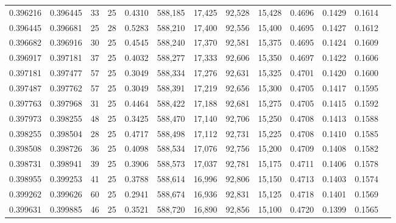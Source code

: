 \begin{tabular}{rrrrrrrrrrrrr}
0.396216 & 0.396445 &    33 &  25 &                                     0.4310 & 588,185 &  17,425 &  92,528 &  15,428 & 0.4696 & 0.1429 & 0.1614 \\
0.396445 & 0.396681 &    25 &  28 &                                     0.5283 & 588,210 &  17,400 &  92,556 &  15,400 & 0.4695 & 0.1427 & 0.1612 \\
0.396682 & 0.396916 &    30 &  25 &                                     0.4545 & 588,240 &  17,370 &  92,581 &  15,375 & 0.4695 & 0.1424 & 0.1609 \\
0.396917 & 0.397181 &    37 &  25 &                                     0.4032 & 588,277 &  17,333 &  92,606 &  15,350 & 0.4697 & 0.1422 & 0.1606 \\
0.397181 & 0.397477 &    57 &  25 &                                     0.3049 & 588,334 &  17,276 &  92,631 &  15,325 & 0.4701 & 0.1420 & 0.1600 \\
0.397487 & 0.397762 &    57 &  25 &                                     0.3049 & 588,391 &  17,219 &  92,656 &  15,300 & 0.4705 & 0.1417 & 0.1595 \\
0.397763 & 0.397968 &    31 &  25 &                                     0.4464 & 588,422 &  17,188 &  92,681 &  15,275 & 0.4705 & 0.1415 & 0.1592 \\
0.397973 & 0.398255 &    48 &  25 &                                     0.3425 & 588,470 &  17,140 &  92,706 &  15,250 & 0.4708 & 0.1413 & 0.1588 \\
0.398255 & 0.398504 &    28 &  25 &                                     0.4717 & 588,498 &  17,112 &  92,731 &  15,225 & 0.4708 & 0.1410 & 0.1585 \\
0.398508 & 0.398726 &    36 &  25 &                                     0.4098 & 588,534 &  17,076 &  92,756 &  15,200 & 0.4709 & 0.1408 & 0.1582 \\
0.398731 & 0.398941 &    39 &  25 &                                     0.3906 & 588,573 &  17,037 &  92,781 &  15,175 & 0.4711 & 0.1406 & 0.1578 \\
0.398955 & 0.399253 &    41 &  25 &                                     0.3788 & 588,614 &  16,996 &  92,806 &  15,150 & 0.4713 & 0.1403 & 0.1574 \\
0.399262 & 0.399626 &    60 &  25 &                                     0.2941 & 588,674 &  16,936 &  92,831 &  15,125 & 0.4718 & 0.1401 & 0.1569 \\
0.399631 & 0.399885 &    46 &  25 &                                     0.3521 & 588,720 &  16,890 &  92,856 &  15,100 & 0.4720 & 0.1399 & 0.1565 \\

\end{tabular}
